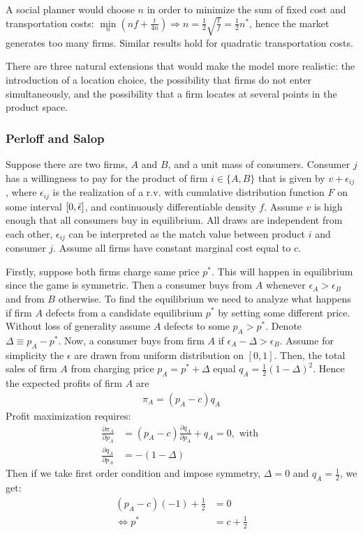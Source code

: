 A social planner would choose $n$ in order to minimize the sum of fixed cost and transportation
costs: $\underset{n}{\min}\left(nf+\frac{t}{4n}\right)
	\Longrightarrow n=\frac{1}{2}\sqrt{\frac{t}{f}}=\frac{1}{2}n^*$, hence the market generates
too many firms. Similar results hold for quadratic transportation costs.

There are three natural extensions that would make the model more realistic: the
introduction of a location choice, the possibility that firms do not enter simultaneously,
and the possibility that a firm locates at several points in the product space.
\subsubsection{Perloff and Salop}
Suppose there are two firms, $A$ and $B$, and a unit mass of consumers. Consumer $j$ has a
willingness to pay for the product of firm $i\in\{A,B\}$ that is given by $v+\epsilon_{ij}$,
where $\epsilon_{ij}$ is the realization of a r.v. with cumulative distribution function $F$ on
some interval $[0,\Bar{\epsilon}]$, and continuously differentiable density $f$. Assume $v$ is
high enough that all consumers buy in equilibrium. All draws are independent from each other,
$\epsilon_{ij}$ can be interpreted as the match value between product $i$ and consumer $j$.
Assume all firms have constant marginal cost equal to $c$.

Firstly, suppose both firms charge same price $p^*$. This will happen in equilibrium since the
game is symmetric. Then a consumer buys from $A$ whenever $\epsilon_A>\epsilon_B$ and from $B$
otherwise. To find the equilibrium we need to analyze what happens if firm $A$ defects from a
candidate equilibrium $p^*$ by setting some different price. Without loss of generality assume $A$
defects to some $p_A>p^*$. Denote $\Delta\equiv p_A-p^*$. Now, a consumer buys from firm $A$ if
$\epsilon_A-\Delta>\epsilon_B$. Assume for simplicity the $\epsilon$ are drawn from uniform
distribution on $[0,1]$. Then, the total sales of firm $A$ from charging price
$p_A=p^*+\Delta$ equal $q_A=\frac{1}{2}(1-\Delta)^2$. Hence the expected profits of firm $A$ are
\begin{align}
	\pi_A=(p_A-c)q_A
\end{align}
Profit maximization requires:
\begin{align}
	\frac{\partial\pi_A}{\partial p_A} & =(p_A-c)\frac{\partial q_A}{\partial p_A}+q_A=0,
	\text{ with }\label{eq:FOC_perloff_salop}                                             \\
	\frac{\partial q_A}{\partial p_A}  & =-(1-\Delta)
\end{align}
Then if we take first order condition and impose symmetry, $\Delta=0$ and $q_A=\frac{1}{2}$, we get:
\begin{align}
	(p_A-c)(-1)+\frac{1}{2} & =0             \\
	\Longleftrightarrow p^* & =c+\frac{1}{2}
\end{align}

